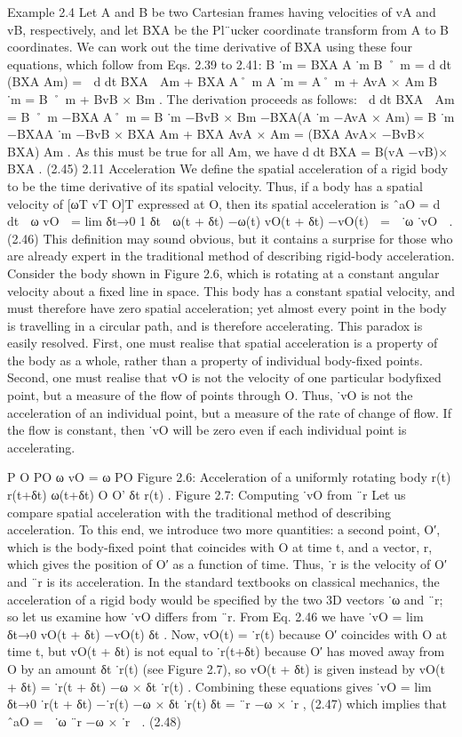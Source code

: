 Example 2.4 Let A and B be two Cartesian frames having velocities of vA and vB, respectively, and let BXA be the Pl¨ucker coordinate transform from A to B coordinates. We can work out the time derivative of BXA using these four equations, which follow from Eqs. 2.39 to 2.41: B ˙m = BXA A ˙m B ˚ m = d dt (BXA Am) =  d dt BXA  Am + BXA A˚ m A ˙m = A˚ m + AvA × Am B ˙m = B ˚ m + BvB × Bm . The derivation proceeds as follows:  d dt BXA  Am = B ˚ m −BXA A˚ m = B ˙m −BvB × Bm −BXA(A ˙m −AvA × Am) = B ˙m −BXAA ˙m −BvB × BXA Am + BXA AvA × Am = (BXA AvA× −BvB× BXA) Am . As this must be true for all Am, we have d dt BXA = B(vA −vB)× BXA . (2.45) 2.11 Acceleration We define the spatial acceleration of a rigid body to be the time derivative of its spatial velocity. Thus, if a body has a spatial velocity of [ωT vT O]T expressed at O, then its spatial acceleration is ˆaO = d dt  ω vO  = lim δt→0 1 δt  ω(t + δt) −ω(t) vO(t + δt) −vO(t)  =  ˙ω ˙vO  . (2.46) This definition may sound obvious, but it contains a surprise for those who are already expert in the traditional method of describing rigid-body acceleration. Consider the body shown in Figure 2.6, which is rotating at a constant angular velocity about a fixed line in space. This body has a constant spatial velocity, and must therefore have zero spatial acceleration; yet almost every point in the body is travelling in a circular path, and is therefore accelerating. This paradox is easily resolved. First, one must realise that spatial acceleration is a property of the body as a whole, rather than a property of individual body-fixed points. Second, one must realise that vO is not the velocity of one particular bodyfixed point, but a measure of the flow of points through O. Thus, ˙vO is not the acceleration of an individual point, but a measure of the rate of change of flow. If the flow is constant, then ˙vO will be zero even if each individual point is accelerating.

P O PO ω vO = ω PO Figure 2.6: Acceleration of a uniformly rotating body r(t) r(t+δt) ω(t+δt) O O’ δt r(t) . Figure 2.7: Computing ˙vO from ¨r Let us compare spatial acceleration with the traditional method of describing acceleration. To this end, we introduce two more quantities: a second point, O′, which is the body-fixed point that coincides with O at time t, and a vector, r, which gives the position of O′ as a function of time. Thus, ˙r is the velocity of O′ and ¨r is its acceleration. In the standard textbooks on classical mechanics, the acceleration of a rigid body would be specified by the two 3D vectors ˙ω and ¨r; so let us examine how ˙vO differs from ¨r. From Eq. 2.46 we have ˙vO = lim δt→0 vO(t + δt) −vO(t) δt . Now, vO(t) = ˙r(t) because O′ coincides with O at time t, but vO(t + δt) is not equal to ˙r(t+δt) because O′ has moved away from O by an amount δt ˙r(t) (see Figure 2.7), so vO(t + δt) is given instead by vO(t + δt) = ˙r(t + δt) −ω × δt ˙r(t) . Combining these equations gives ˙vO = lim δt→0 ˙r(t + δt) −˙r(t) −ω × δt ˙r(t) δt = ¨r −ω × ˙r , (2.47) which implies that ˆaO =  ˙ω ¨r −ω × ˙r  . (2.48)

